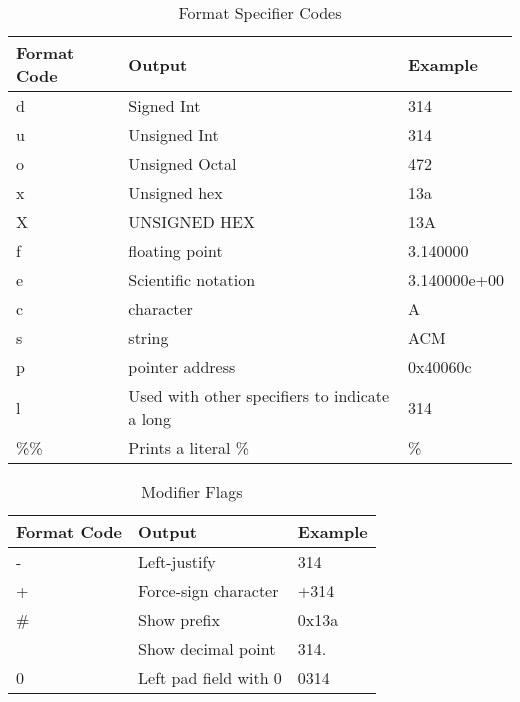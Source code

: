 \documentclass[letterpaper, 10pt]{report}
\begin{document}
\begin{table}[h]
    \caption{Format Specifier Codes \cite{cplusplus}}
    \begin{tabularx}{\textwidth}{|l|X|l|} \hline
        Format Code &   Output              &   Example     \\ \hline
        d           &   Signed Int          &   314         \\
        u           &   Unsigned Int        &   314         \\
        o           &   Unsigned Octal      &   472         \\
        x           &   Unsigned hex        &   13a         \\
        X           &   UNSIGNED HEX        &   13A         \\
        f           &   floating point      &   3.140000    \\
        e           &   Scientific notation &   3.140000e+00\\
        c           &   character           &   A           \\
        s           &   string              &   ACM         \\
        p           &   pointer address     &   0x40060c    \\
        l           &   Used with other specifiers to indicate a long & 314 \\
        \%\%        &   Prints a literal \% &   \%          \\
        \hline
    \end{tabularx}
\end{table}

\begin{table}[h]
    \caption{Modifier Flags \cite{cplusplus}}
    \begin{tabularx}{\textwidth}{|l|X|l|} \hline
        Format Code &   Output                  &   Example    \\ \hline
        -           &   Left-justify            &   314        \\
        +           &   Force-sign character    &   +314       \\
        \#          &   Show prefix             &   0x13a      \\
                    &   Show decimal point      &   314.       \\
        0           &   Left pad field with 0   &   0314       \\
        \hline
    \end{tabularx}
\end{table}
\end{document}

